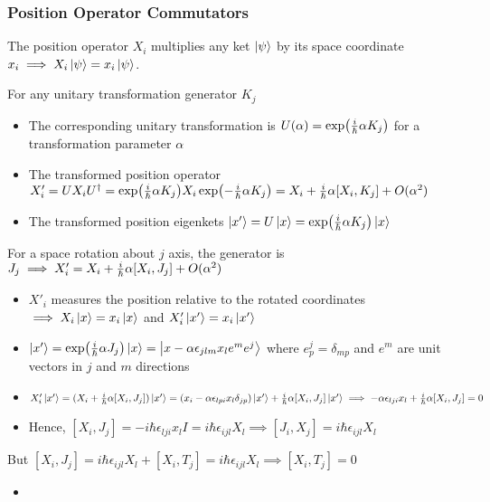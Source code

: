 \documentclass[8pt,t,mathserif,aspectratio=169]{beamer}
\begin{document}
\begin{frame}
  \frametitle{Position Operator Commutators}
  \vspace{1mm}
  The position operator $X_i$ multiplies any ket $\ket{\psi}$ by its space coordinate $x_i \implies X_i \ket{\psi} = x_i \ket{\psi}$. 

  For any unitary transformation generator $K_j$
  \begin{itemize}
    \item The corresponding unitary transformation is $U(\alpha) = \exp({i \over \hbar} \alpha K_j)$ for a transformation parameter $\alpha$
    \item The transformed position operator $X'_i = U X_i U^{\dagger} = \exp({i \over \hbar} \alpha K_j) X_i \exp(-{i \over \hbar} \alpha K_j) = X_i + {i \over \hbar} \alpha [X_i,K_j] + O(\alpha^2)$
    \item The transformed position eigenkets $\ket{x'} = U \ket{x} = \exp({i \over \hbar} \alpha K_j) \ket{x}$
  \end{itemize}
  For a space rotation about $j$ axis, the generator is $J_j \implies X'_i = X_i + {i \over \hbar} \alpha [X_i,J_j] + O(\alpha^2)$
  \begin{itemize}
    \item $X'_i$ measures the position relative to the rotated coordinates $\implies X_i \ket{x} = x_i \ket{x}$ and $X'_i \ket{x'} = x_i \ket{x'}$
    \item $\ket{x'} = \exp({i \over \hbar} \alpha J_j) \ket{x} = \ket{x - \alpha \epsilon_{jlm} x_l e^m e^j}$ where $e^j_p = \delta_{mp}$ and $e^m$ are unit vectors in $j$ and $m$ directions
    \item $X'_i \ket{x'} = (X_i + {i \over \hbar} \alpha [X_i,J_j])\ket{x'} = (x_i - \alpha \epsilon_{lpi} x_l \delta_{jp})\ket{x'} + {i \over \hbar} \alpha [X_i,J_j] \ket{x'} \implies -\alpha \epsilon_{lji} x_l + {i \over \hbar} \alpha [X_i,J_j] = 0$
    \item Hence, $[X_i,J_j] = -i \hbar \epsilon_{lji} x_l I = i \hbar \epsilon_{ijl} X_l \implies [J_i,X_j] = i \hbar \epsilon_{ijl} X_l$
  \end{itemize}
  But $[X_i,J_j] = i \hbar \epsilon_{ijl} X_l + [X_i,T_j] = i \hbar \epsilon_{ijl} X_l \implies [X_i,T_j] = 0$ 
  \begin{itemize}
    \item 
  \end{itemize}
\end{frame}
\end{document}
